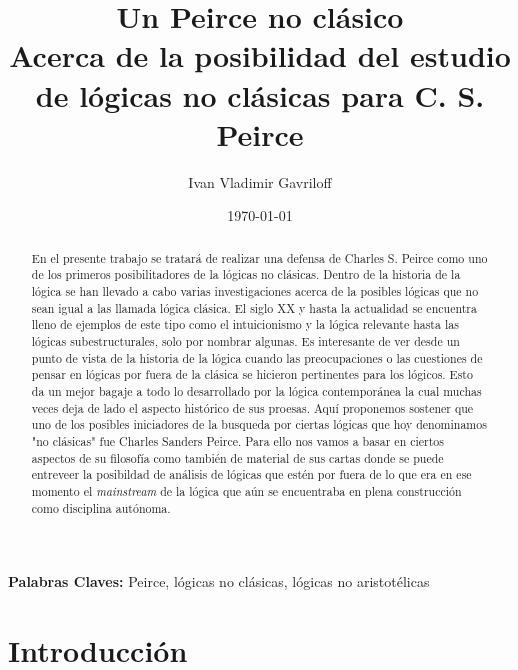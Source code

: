 \documentclass[
  structure  = article,
  pagelayout = periodicalaureo,%
  secfont    = italic,
  subsecfont = italic,
  version    = final,%
]{suftesi}
\author{Ivan Vladimir Gavriloff}
\affil{Universidad Nacional de Tucumán}
\affil{CONICET}
\title[Un Peirce no clásico]{
  Un Peirce no clásico\\
  Acerca de la posibilidad del estudio de lógicas no clásicas para C. S. Peirce
  }
\date{\today}
\begin{document}
\maketitle

\begin{abstract}
  \noindent
  En el presente trabajo se tratará de realizar una defensa de Charles S. Peirce como uno de los primeros posibilitadores de la lógicas no clásicas. Dentro de la historia de la lógica se han llevado a cabo varias investigaciones acerca de la posibles lógicas que no sean igual a las llamada lógica clásica. El siglo XX y hasta la actualidad se encuentra lleno de ejemplos de este tipo como el intuicionismo y la lógica relevante hasta las lógicas subestructurales, solo por nombrar algunas. Es interesante de ver desde un punto de vista de la historia de la lógica cuando las preocupaciones o las cuestiones de pensar en lógicas por fuera de la clásica se hicieron pertinentes para los lógicos. Esto da un mejor bagaje a todo lo desarrollado por la lógica contemporánea la cual muchas veces deja de lado el aspecto histórico de sus proesas. Aquí proponemos sostener que uno de los posibles iniciadores de la busqueda por ciertas lógicas que hoy denominamos "no clásicas" fue Charles Sanders Peirce. Para ello nos vamos a basar en ciertos aspectos de su filosofía como también de material de sus cartas donde se puede entreveer la posibildad de análisis de lógicas que estén por fuera de lo que era en ese momento el \textit{mainstream} de la lógica que aún se encuentraba en plena construcción como disciplina autónoma.
\end{abstract}

{\noindent\textbf{Palabras Claves:} Peirce, lógicas no clásicas, lógicas no aristotélicas}

\medskip


\section{Introducción}
\label{Introducción}
\end{document}
